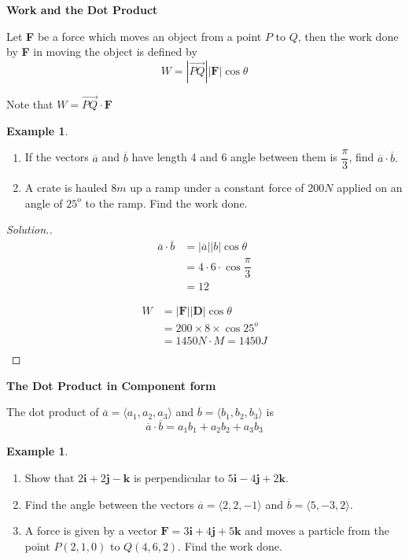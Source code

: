 \documentclass[11pt,a4paper]{article}
\theoremstyle{definition}
\newtheorem{exa}[thm]{Example}
\newenvironment{solution}
  {\renewcommand{\qedsymbol}{}\begin{proof}[\textit{Solution}.]}
  {\end{proof}}
\newcommand{\subhead}[1]{%
  \par\medskip\noindent\textbf{#1}\par\nobreak\smallskip}
\begin{document}
\subhead{Work and the Dot Product}


Let \textbf{F} be a force which moves an object from a point $P$ to $Q$, then the work done by \textbf{F} in moving the object is defined by $$W = \left|\overrightarrow{PQ}\right|\left|\textbf{F}\right| \cos \theta$$

Note that $W = \overrightarrow{PQ}\cdot \textbf{F}$


\begin{exa}
\begin{enumerate}
\item If the vectors $\overline{a}$ and $\overline{b}$ have length 4 and 6 angle between them is $\dfrac{\pi}{3}$, find $\overline{a}\cdot\overline{b}.$
\item A crate is hauled 8$m$ up a ramp under a constant force of $200 N$ applied on an angle of $25^o$ to the ramp. Find the work done.
\end{enumerate}
\end{exa}

\begin{solution}
\begin{align*}
\overline{a}\cdot \overline{b} & = \left|\overline{a}\right|\left|b\right|\cos \theta\\
& = 4\cdot 6\cdot \cos \dfrac{\pi}{3}\\
& = 12
\end{align*}

\begin{align*}
W & = \left|\textbf{F}\right|\left|\textbf{D}\right|\cos \theta\\
& = 200 \times 8 \times \cos 25^o\\
& = 1450 N\cdot M = 1450 J\\
\end{align*}
\end{solution}

\subhead{The Dot Product in Component form}


The dot product of $\overline{a} = \langle a_1, a_2, a_3\rangle$ and $\overline{b} = \langle b_1, b_2, b_3\rangle$ is $$\overline{a}\cdot \overline{b} = a_1b_1 + a_2b_2 + a_3b_3$$

\begin{exa}
\begin{enumerate}
\item Show that $2\textbf{i} + 2\textbf{j} -\textbf{k}$ is perpendicular to $ 5\textbf{i} - 4\textbf{j} + 2\textbf{k}$.
\item Find the angle between the vectors $\overline{a} = \langle 2,2,-1\rangle$ and $\overline{b} = \langle 5, -3,2\rangle$.
\item A force is given by a vector $\textbf{F} = 3\textbf{i} + 4\textbf{j} + 5\textbf{k}$ and moves a particle from the point $P(2,1,0)$ to $Q(4,6,2)$. Find the work done.
\end{enumerate}
\end{exa}
\end{document}
